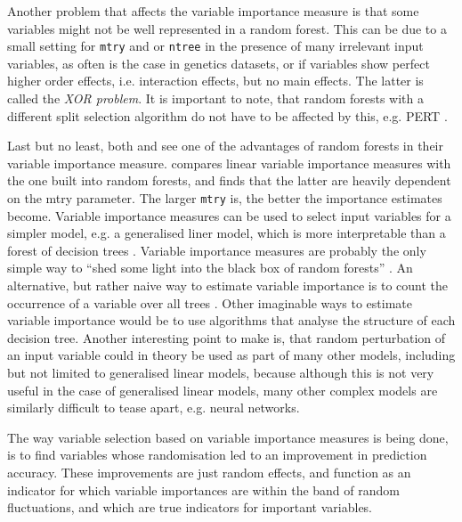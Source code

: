 \documentclass[a4paper,man,12pt,apacite,floatsintext]{apa6} %
\begin{document}
Another problem that affects the variable importance measure
is that some variables might not be well represented in a random forest.
This can be due to a small setting for \texttt{mtry} and or \texttt{ntree}
in the presence of many irrelevant input variables, as often is the case
in genetics datasets, or if variables show perfect higher order effects,
i.e. interaction effects, but no main effects.
The latter is called the \emph{XOR problem}.
It is important to note, that random forests with a different split selection
algorithm do not have to be affected by this, e.g. PERT \cite{cutler2001pert}.

Last but no least, both  and
 see one of the advantages of random forests in
their variable importance measure.
\cite{gromping2009variable} compares linear variable importance measures
with the one built into random forests, and finds that the latter are
heavily dependent on the mtry parameter.
The larger \texttt{mtry} is, the better the importance estimates become.
Variable importance measures can be used to select input variables for a simpler
model, e.g. a generalised liner model, which is more interpretable than a
forest of decision trees \cite{strobl2009introduction}.
Variable importance measures are probably the only simple way to
“shed some light into the black box of random forests”
\cite{gromping2009variable}.
An alternative, but rather naive way to estimate variable importance is to count
the occurrence of a variable over all trees \cite{strobl2009introduction}.
Other imaginable ways to estimate variable importance would be to use
algorithms that analyse the structure of each decision tree.
Another interesting point to make is, that random perturbation of an input
variable could in theory be used as part of many other models, including but
not limited to generalised linear models, because although
this is not very useful in the case of generalised linear models,
many other complex models are similarly difficult to tease apart, e.g.
neural networks.

The way variable selection based on variable importance measures is
being done, is to find variables whose randomisation led to an improvement
in prediction accuracy.
These improvements are just random effects, and function as an indicator
for which variable importances are within the band of random fluctuations,
and which are true indicators for important variables.
\end{document}
